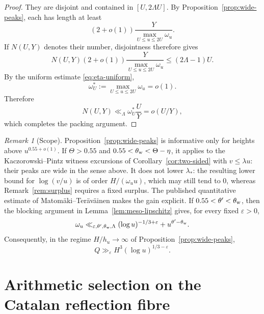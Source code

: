 \documentclass[11pt,reqno]{amsart}
\numberwithin{equation}{section}
\theoremstyle{plain}
\theoremstyle{definition}
\theoremstyle{remark}
\newtheorem{remark}[theorem]{Remark}
\begin{document}
\begin{proof}
They are disjoint and contained in $[U,2\Lambda U]$. By
Proposition~\ref{prop:wide-peaks}, each has length at least
\begin{equation}
 (2+o(1))\frac{Y}{\max_{U\le u\le2U}\omega_u}.
\end{equation}
If $N(U,Y)$ denotes their number, disjointness therefore gives
\begin{equation}
 N(U,Y)(2+o(1))\frac{Y}{\max_{U\le u\le2U}\omega_u}
 \le (2\Lambda-1)U.
\end{equation}
By the uniform estimate \eqref{eq:eta-uniform},
\begin{equation}
\omega_U^*:=\max_{U\le u\le2U}\omega_u=o(1).
\end{equation}
Therefore
\begin{equation}
N(U,Y)\ll_\Lambda \omega_U^*\frac{U}{Y}=o(U/Y),
\end{equation}
which completes the packing argument.
\end{proof}

\begin{remark}[Scope]
\label{rem:wide-peaks-scope}
Proposition~\ref{prop:wide-peaks} is informative only for heights above
$u^{0.55+o(1)}$. If $\Theta>0.55$ and $0.55<\theta_{\rm w}<\Theta-\eta$, it
applies to the Kaczorowski--Pintz witness excursions of
Corollary~\ref{cor:two-sided} with $v\le\lambda u$: their peaks are wide in
the sense above. It does not lower $\lambda_*$: the resulting lower bound
for $\log(v/u)$ is of order $H/(\omega_uu)$, which may still tend to $0$,
whereas Remark~\ref{rem:surplus} requires a fixed surplus. The published
quantitative estimate of Matom\"aki--Ter\"av\"ainen
\cite[Theorem~1.1]{MatomakiTeravainen2023} makes the gain explicit. If
$0.55<\theta'<\theta_{\rm w}$, then the blocking argument in
Lemma~\ref{lem:meso-lipschitz} gives, for every fixed $\varepsilon>0$,
\begin{equation}
\omega_u\ll_{\varepsilon,\theta',\theta_{\rm w},\Lambda}
(\log u)^{-1/3+\varepsilon}+u^{\theta'-\theta_{\rm w}}.
\end{equation}
Consequently, in the regime $H/h_u\to\infty$ of
Proposition~\ref{prop:wide-peaks},
\begin{equation}
Q\gg_{\varepsilon}H^3(\log u)^{1/3-\varepsilon}.
\end{equation}
\end{remark}




\section{Arithmetic selection on the Catalan reflection fibre}
\label{sec:arithmetic-selection-fibre}
\end{document}
